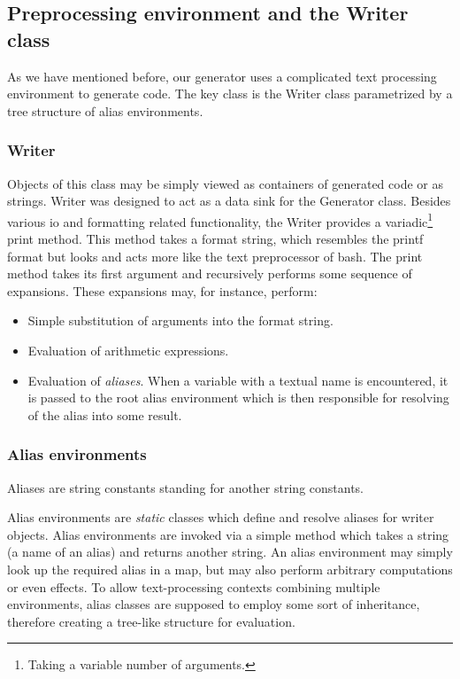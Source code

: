 \subsection*{Preprocessing environment and the Writer class}

As we have mentioned before, our generator uses a complicated text processing environment to generate code. The key class is the Writer class parametrized by a tree structure of alias environments. 

\subsubsection{Writer}
Objects of this class may be simply viewed as containers of generated code or as strings. Writer was designed to act as a data sink for the Generator class. Besides various io and formatting related functionality, the Writer provides a variadic\footnote{Taking a variable number of arguments.} print method. This method takes a format string, which resembles the printf format but looks and acts more like the text preprocessor of bash. The print method takes its first argument and recursively performs some sequence of expansions. These expansions may, for instance, perform:
\begin{itemize}
  \item Simple substitution of arguments into the format string.
  \item Evaluation of arithmetic expressions. 
  \item Evaluation of \emph{aliases}. When a variable with a textual name is encountered, it is passed to the root alias environment which is then responsible for resolving of the alias into some result.
\end{itemize}

\subsubsection{Alias environments}
Aliases are string constants standing for another string constants.

Alias environments are \emph{static} classes which define and resolve aliases for writer objects. Alias environments are invoked via a simple method which takes a string (a name of an alias) and returns another string. An alias environment may simply look up the required alias in a map, but may also perform arbitrary computations or even effects. To allow text-processing contexts combining multiple environments, alias classes are supposed to employ some sort of inheritance, therefore creating a tree-like structure for evaluation. 

